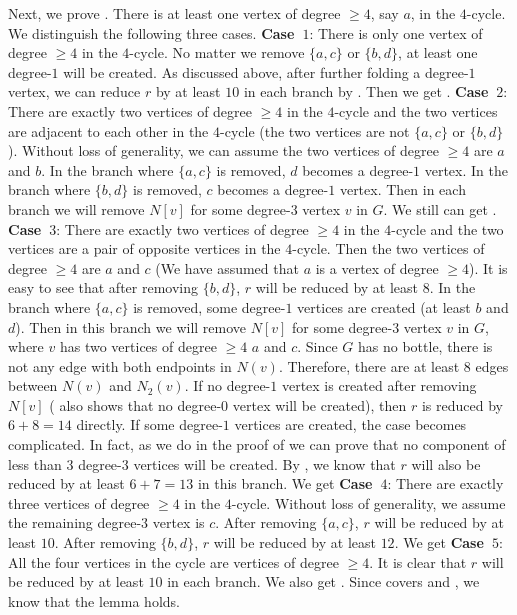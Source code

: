 \documentclass[runningheads]{llncs}
\begin{document}
{Next, we prove . There is at least one vertex of
degree $\geq4$, say $a$, in the $4$-cycle. We distinguish the
following three cases. \textbf{Case~$1$}: There is only one vertex
of degree $\geq4$ in the $4$-cycle. No matter we remove $\{a, c\}$
or $\{b, d\}$, at least one degree-$1$ will be created. As
discussed above, after further folding a degree-$1$ vertex, we can
reduce $r$ by at least $10$ in each branch by . Then
we get . \textbf{Case~$2$}: There are exactly two
vertices of degree $\geq4$ in the $4$-cycle and the two vertices
are adjacent to each other in the $4$-cycle (the two vertices are
not $\{a,c\}$ or $\{b,d\}$). Without loss of generality, we can
assume the two vertices of degree $\geq4$ are $a$ and $b$. In the
branch where $\{a, c\}$ is removed, $d$ becomes a degree-$1$
vertex. In the branch where $\{b, d\}$ is removed, $c$ becomes a
degree-$1$ vertex. Then in each branch we will remove $N[v]$ for
some degree-$3$ vertex $v$ in $G$. We still can get .
 \textbf{Case~$3$}: There are exactly two
vertices of degree $\geq4$ in the $4$-cycle and the two vertices
are a pair of opposite vertices in the $4$-cycle. Then the two
vertices of degree $\geq4$ are $a$ and $c$ (We have assumed that
$a$ is a vertex of degree $\geq4$). It is easy to see that after
removing $\{b, d\}$, $r$ will be reduced by at least $8$. In the
branch where $\{a, c\}$ is removed, some degree-$1$ vertices are
created (at least $b$ and $d$). Then in this branch we will remove
$N[v]$ for some degree-$3$ vertex $v$ in $G$, where $v$ has two
vertices of degree $\geq4$ $a$ and $c$. Since $G$ has no bottle,
there is not any edge with both endpoints in $N(v)$. Therefore,
there are at least $8$ edges between $N(v)$ and $N_2(v)$. If no
degree-$1$ vertex is created after removing $N[v]$ (
also shows that no degree-$0$ vertex will be created), then $r$ is
reduced by $6+8=14$ directly. If some degree-$1$ vertices are
created, the case becomes complicated. In fact, as we do in the
proof of  we can prove that no component of less
than $3$ degree-$3$ vertices will be created. By  , we
know that $r$ will also be reduced by at least $6+7=13$ in this
branch. We get 
\textbf{Case~$4$}: There are exactly three vertices of degree
$\geq4$ in the $4$-cycle. Without loss of generality, we assume
the remaining degree-$3$ vertex is $c$. After removing $\{a, c\}$,
$r$ will be reduced by at least $10$. After removing $\{b, d\}$,
$r$ will be reduced by at least $12$. We get  \textbf{Case~$5$}: All the four vertices in the
cycle are vertices of degree $\geq4$. It is clear that $r$ will be
reduced by at least $10$ in each branch. We also get .
Since  covers  and , we know
that the lemma holds. }
\end{document}
